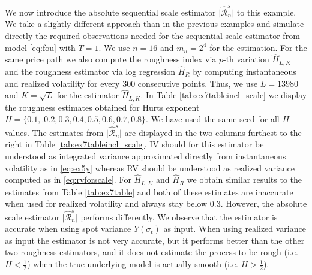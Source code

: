 \documentclass{article}
\begin{document}
We now introduce the absolute sequential scale estimator $\lvert \widehat{\mathscr{R}}_n^s\rvert$ to this example. We take a slightly different approach than in the previous examples and simulate directly the required observations needed for the sequential scale estimator from model \eqref{eq:fou} with $T=1$. We use $n=16$ and $m_n = 2^4$ for the estimation. For the same price path we also compute the roughness index via $p$-th variation $\hat{H}_{L,K}$ and the roughness estimator via log regression $\widehat{H}_R$ by computing instantaneous and realized volatility for every 300 consecutive points. Thus, we use $L=13980$ and $K=\sqrt{L}$ for the estimator $\hat{H}_{L,K}$. In Table \ref{tab:ex7tableincl_scale} we display the roughness estimates obtained for Hurts exponent $H=\{0.1,.0.2,0.3,0.4,0.5,0.6,0.7,0.8\}$. We have used the same seed for all $H$ values. The estimates from $\lvert \widehat{\mathscr{R}}_n^s\rvert$ are displayed in the two columns furthest to the right in Table \ref{tab:ex7tableincl_scale}. IV should for this estimator be understood as integrated variance approximated directly from instantaneous volatility as in \eqref{eq:ex5y} whereas RV should be understood as realized variance computed as in \eqref{eq:rvforscale}. For $\widehat{H}_{L,K}$ and $\widehat{H}_{R}$ we obtain similar results to the estimates from Table \ref{tab:ex7table} and both of these estimates are inaccurate when used for realized volatility and always stay below 0.3. However, the absolute scale estimator $\lvert \widehat{\mathscr{R}}_n^s\rvert$ performs differently. We observe that the estimator is accurate when using spot variance $Y(\sigma_t)$ as input. When using realized variance as input the estimator is not very accurate, but it performs better than the other two roughness estimators, and it does not estimate the process to be rough (i.e. $H<\frac{1}{2}$) when the true underlying model is actually smooth (i.e. $H>\frac{1}{2}$).
\end{document}
